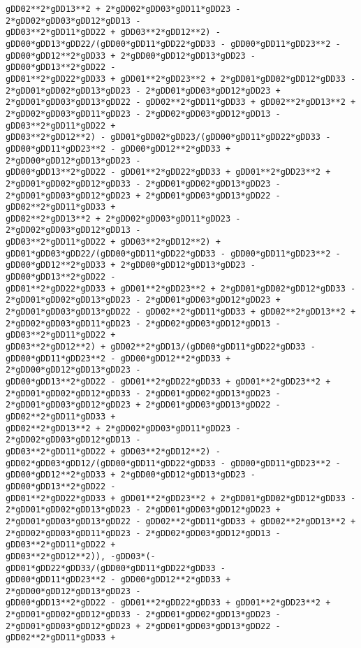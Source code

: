 \documentclass[landscape,letterpaper,10pt,english]{article}
\begin{document}
\begin{Verbatim}[commandchars=\\\{\}]
gDD02**2*gDD13**2 + 2*gDD02*gDD03*gDD11*gDD23 - 2*gDD02*gDD03*gDD12*gDD13 -
gDD03**2*gDD11*gDD22 + gDD03**2*gDD12**2) -
gDD00*gDD13*gDD22/(gDD00*gDD11*gDD22*gDD33 - gDD00*gDD11*gDD23**2 -
gDD00*gDD12**2*gDD33 + 2*gDD00*gDD12*gDD13*gDD23 - gDD00*gDD13**2*gDD22 -
gDD01**2*gDD22*gDD33 + gDD01**2*gDD23**2 + 2*gDD01*gDD02*gDD12*gDD33 -
2*gDD01*gDD02*gDD13*gDD23 - 2*gDD01*gDD03*gDD12*gDD23 +
2*gDD01*gDD03*gDD13*gDD22 - gDD02**2*gDD11*gDD33 + gDD02**2*gDD13**2 +
2*gDD02*gDD03*gDD11*gDD23 - 2*gDD02*gDD03*gDD12*gDD13 - gDD03**2*gDD11*gDD22 +
gDD03**2*gDD12**2) - gDD01*gDD02*gDD23/(gDD00*gDD11*gDD22*gDD33 -
gDD00*gDD11*gDD23**2 - gDD00*gDD12**2*gDD33 + 2*gDD00*gDD12*gDD13*gDD23 -
gDD00*gDD13**2*gDD22 - gDD01**2*gDD22*gDD33 + gDD01**2*gDD23**2 +
2*gDD01*gDD02*gDD12*gDD33 - 2*gDD01*gDD02*gDD13*gDD23 -
2*gDD01*gDD03*gDD12*gDD23 + 2*gDD01*gDD03*gDD13*gDD22 - gDD02**2*gDD11*gDD33 +
gDD02**2*gDD13**2 + 2*gDD02*gDD03*gDD11*gDD23 - 2*gDD02*gDD03*gDD12*gDD13 -
gDD03**2*gDD11*gDD22 + gDD03**2*gDD12**2) +
gDD01*gDD03*gDD22/(gDD00*gDD11*gDD22*gDD33 - gDD00*gDD11*gDD23**2 -
gDD00*gDD12**2*gDD33 + 2*gDD00*gDD12*gDD13*gDD23 - gDD00*gDD13**2*gDD22 -
gDD01**2*gDD22*gDD33 + gDD01**2*gDD23**2 + 2*gDD01*gDD02*gDD12*gDD33 -
2*gDD01*gDD02*gDD13*gDD23 - 2*gDD01*gDD03*gDD12*gDD23 +
2*gDD01*gDD03*gDD13*gDD22 - gDD02**2*gDD11*gDD33 + gDD02**2*gDD13**2 +
2*gDD02*gDD03*gDD11*gDD23 - 2*gDD02*gDD03*gDD12*gDD13 - gDD03**2*gDD11*gDD22 +
gDD03**2*gDD12**2) + gDD02**2*gDD13/(gDD00*gDD11*gDD22*gDD33 -
gDD00*gDD11*gDD23**2 - gDD00*gDD12**2*gDD33 + 2*gDD00*gDD12*gDD13*gDD23 -
gDD00*gDD13**2*gDD22 - gDD01**2*gDD22*gDD33 + gDD01**2*gDD23**2 +
2*gDD01*gDD02*gDD12*gDD33 - 2*gDD01*gDD02*gDD13*gDD23 -
2*gDD01*gDD03*gDD12*gDD23 + 2*gDD01*gDD03*gDD13*gDD22 - gDD02**2*gDD11*gDD33 +
gDD02**2*gDD13**2 + 2*gDD02*gDD03*gDD11*gDD23 - 2*gDD02*gDD03*gDD12*gDD13 -
gDD03**2*gDD11*gDD22 + gDD03**2*gDD12**2) -
gDD02*gDD03*gDD12/(gDD00*gDD11*gDD22*gDD33 - gDD00*gDD11*gDD23**2 -
gDD00*gDD12**2*gDD33 + 2*gDD00*gDD12*gDD13*gDD23 - gDD00*gDD13**2*gDD22 -
gDD01**2*gDD22*gDD33 + gDD01**2*gDD23**2 + 2*gDD01*gDD02*gDD12*gDD33 -
2*gDD01*gDD02*gDD13*gDD23 - 2*gDD01*gDD03*gDD12*gDD23 +
2*gDD01*gDD03*gDD13*gDD22 - gDD02**2*gDD11*gDD33 + gDD02**2*gDD13**2 +
2*gDD02*gDD03*gDD11*gDD23 - 2*gDD02*gDD03*gDD12*gDD13 - gDD03**2*gDD11*gDD22 +
gDD03**2*gDD12**2)), -gDD03*(-gDD01*gDD22*gDD33/(gDD00*gDD11*gDD22*gDD33 -
gDD00*gDD11*gDD23**2 - gDD00*gDD12**2*gDD33 + 2*gDD00*gDD12*gDD13*gDD23 -
gDD00*gDD13**2*gDD22 - gDD01**2*gDD22*gDD33 + gDD01**2*gDD23**2 +
2*gDD01*gDD02*gDD12*gDD33 - 2*gDD01*gDD02*gDD13*gDD23 -
2*gDD01*gDD03*gDD12*gDD23 + 2*gDD01*gDD03*gDD13*gDD22 - gDD02**2*gDD11*gDD33 +

\end{Verbatim}
\end{document}
